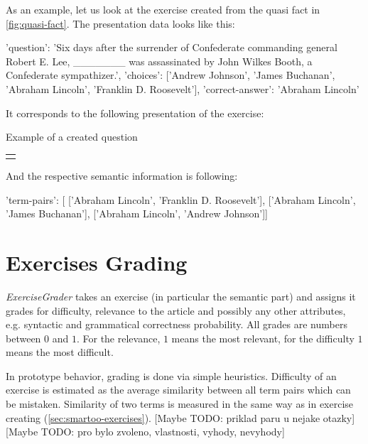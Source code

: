 \documentclass[a4paper, 12pt, twoside]{fithesis2}		%
\renewcommand{\_}{\leavevmode \kern0.0em\vbox{\hrule width0.4em}}
\newcounter{choice}
\renewcommand\thechoice{\Alph{choice}}
\newcommand\choicelabel{\thechoice.}
\newenvironment{choices}%
  {\vspace{0.8em}\list{\choicelabel}%
     {\usecounter{choice}\def\makelabel##1{\hss\llap{##1}}%
       \settowidth{\leftmargin}{W.\hskip\labelsep\hskip 0.01em}%
       \def\choice{%
         \item
       } %
       \labelwidth\leftmargin\advance\labelwidth-\labelsep
       \topsep=0pt
       \partopsep=0pt
     }%
  }%
  {\vspace{-0.7em}\endlist}
\newenvironment{question}
{
  \begin{center}
  \begin{tabular}{p{0.9\textwidth}}
  \vskip 0.05em
}
{
  \\
  \end{tabular}
  \end{center}
}
\newcommand{\sentenceGap}{\rule{1.5cm}{0.4pt}~}
\begin{document}
As an example, let us look at the exercise created from the quasi fact in \autoref{fig:quasi-fact}. The presentation data looks like this:
\begin{code}
{'question': 'Six days after the surrender of Confederate commanding
              general Robert E. Lee, _______ was assassinated by
              John Wilkes Booth, a Confederate sympathizer.',
'choices': ['Andrew Johnson', 'James Buchanan',
            'Abraham Lincoln', 'Franklin D. Roosevelt'],
'correct-answer': 'Abraham Lincoln'}
\end{code}
It corresponds to the following presentation of the exercise:
\begin{exercise}
\label{exrc:assassination}
\caption{Example of a created question}
  \begin{question}
  Six days after the surrender of Confederate commanding general Robert E. Lee
  \sentenceGap
  was assassinated by John Wilkes Booth, a Confederate sympathizer.

  \begin{choices}
    \choice Andrew Johnson
    \choice James Buchanan
    \choice Abraham Lincoln
    \choice Franklin D. Roosevelt
  \end{choices}
  \end{question}
\end{exercise}

And the respective semantic information is following:
\begin{code}
{'term-pairs': [
    ['Abraham Lincoln', 'Franklin D. Roosevelt'],
    ['Abraham Lincoln', 'James Buchanan'],
    ['Abraham Lincoln', 'Andrew Johnson']]}
\end{code}

\section{Exercises Grading}
\label{sec:smartoo-exercises-grading}

\textit{ExerciseGrader} takes an exercise (in particular the semantic part) and assigns it grades for difficulty, relevance to the article and possibly any other attributes, e.g. syntactic and grammatical correctness probability. All grades are numbers between $0$ and $1$. For the relevance, $1$ means the most relevant, for the difficulty $1$ means the most difficult.

In prototype behavior, grading is done via simple heuristics.
Difficulty of an exercise is estimated as the average similarity between all term pairs which can be mistaken.
Similarity of two terms is measured in the same way as in exercise creating (\autoref{sec:smartoo-exercises}).
[Maybe TODO: priklad paru u nejake otazky] [Maybe TODO: pro bylo zvoleno, vlastnosti, vyhody, nevyhody]
\end{document}
